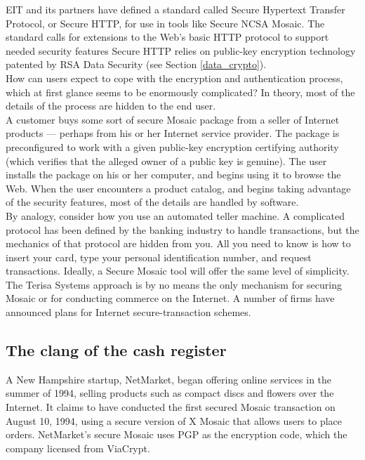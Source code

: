 EIT and its partners have defined a standard called Secure Hypertext
Transfer Protocol, or Secure HTTP, for use in tools like Secure NCSA
Mosaic. The standard calls for extensions to the Web's basic HTTP
protocol to support needed security features Secure HTTP relies on
public-key encryption technology patented by RSA Data Security (see
Section \ref{data_crypto}).\\

How can users expect to cope with the encryption and authentication
process, which at first glance seems to be enormously complicated? In
theory, most of the details of the process are hidden to the end user.\\

A customer buys some sort of secure Mosaic package from a seller of
Internet products --- perhaps from his or her Internet service provider.
The package is preconfigured to work with a given public-key encryption
certifying authority (which verifies that the alleged owner of a public
key is genuine). The user installs the package on his or her computer,
and begins using it to browse the Web. When the user encounters a
product catalog, and begins taking advantage of the security features,
most of the details are handled by software.\\

By analogy, consider how you use an automated teller machine. A
complicated protocol has been defined by the banking industry to handle
transactions, but the mechanics of that protocol are hidden from you.
All you need to know is how to insert your card, type your personal
identification number, and request transactions. Ideally, a Secure
Mosaic tool will offer the same level of simplicity.\\

The Terisa Systems approach is by no means the only mechanism for
securing Mosaic or for conducting commerce on the Internet. A number of
firms have announced plans for Internet secure-transaction schemes.

\subsection{The clang of the cash register}
A New Hampshire startup, NetMarket, began offering online services in
the summer of 1994, selling products such as compact discs and flowers
over the Internet. It claims to have conducted the first secured Mosaic
transaction on August 10, 1994, using a secure version of X Mosaic that
allows users to place orders. NetMarket's secure Mosaic uses PGP as the
encryption code, which the company licensed from ViaCrypt.\\

